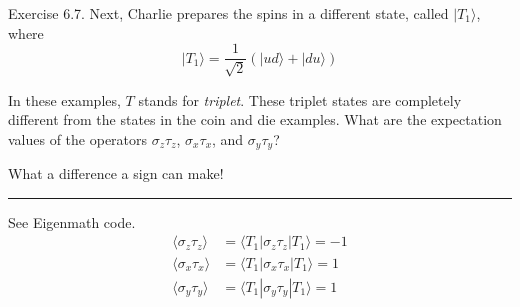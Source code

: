 \documentclass[12pt]{article}
\begin{document}
Exercise 6.7.
Next, Charlie prepares the spins in a different state,
called $|T_1\rangle$, where
\begin{equation*}
|T_1\rangle=\frac{1}{\sqrt2}
\left(
|ud\rangle+|du\rangle
\right)
\end{equation*}

In these examples, $T$ stands for {\it triplet}.
These triplet states are completely different from the
states in the coin and die examples.
What are the expectation values of the operators
$\sigma_z\tau_z$, $\sigma_x\tau_x$, and $\sigma_y\tau_y$?

\bigskip
What a difference a sign can make!

\bigskip
\hrule

\bigskip
See Eigenmath code.
\begin{align*}
\langle\sigma_z\tau_z\rangle&=\langle T_1|\sigma_z\tau_z|T_1\rangle=-1
\\[1ex]
\langle\sigma_x\tau_x\rangle&=\langle T_1|\sigma_x\tau_x|T_1\rangle=1
\\[1ex]
\langle\sigma_y\tau_y\rangle&=\langle T_1|\sigma_y\tau_y|T_1\rangle=1
\end{align*}
\end{document}

